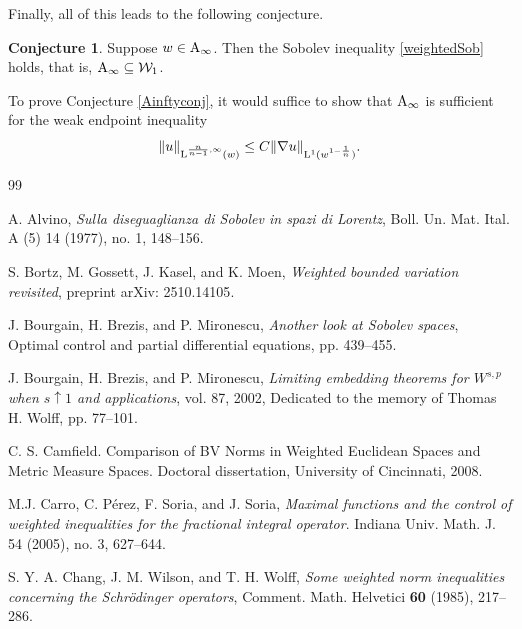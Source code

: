 \documentclass[11pt, a4paper, reqno]{amsart}
\newcommand{\A}{\textup A}
\newcommand{\Lup}{\textup{L}}
\theoremstyle{definition}
\newtheorem{conj}[theorem]{Conjecture}
\theoremstyle{remark}
\begin{document}
Finally, all of this leads to the following conjecture.

\begin{conj}\label{Ainftyconj}
Suppose $w\in \A_\infty$. Then the Sobolev inequality \eqref{weightedSob} holds, that is, $\A_\infty\subseteq \mathcal W_1$.
\end{conj}

To prove Conjecture \eqref{Ainftyconj}, it would suffice to show that $\A_\infty$ is sufficient for the weak endpoint inequality
\[
\|u\|_{\Lup^{\frac{n}{n-1},\infty}(w)}
\leq C\|\nabla u\|_{\Lup^1(w^{1-\frac1n})}.
\]



\begin{thebibliography}{99}

 A. Alvino, \emph{Sulla diseguaglianza di Sobolev in spazi di Lorentz}, Boll. Un. Mat. Ital. A (5) 14 (1977), no. 1, 148--156.

 S. Bortz, M. Gossett, J. Kasel, and K. Moen, \emph{Weighted bounded variation revisited}, preprint \textsf{arXiv: 2510.14105}.

 J. Bourgain, H. Brezis, and P. Mironescu, \emph{Another look at Sobolev spaces}, Optimal control and partial differential equations, pp. 439--455.

 J. Bourgain, H. Brezis, and P. Mironescu, \emph{Limiting embedding theorems for $W^{s,p}$ when $s \uparrow 1$ and applications}, vol. 87, 2002, Dedicated to the memory of Thomas H. Wolff, pp. 77–101.




 C. S. Camfield. Comparison of BV Norms in Weighted Euclidean Spaces and Metric Measure
Spaces. Doctoral dissertation, University of Cincinnati, 2008.

 M.J. Carro, C. P\'erez, F. Soria, and J. Soria, \emph{Maximal functions and the control of weighted inequalities for the fractional integral operator}. Indiana Univ. Math. J. 54 (2005), no. 3, 627--644.

S. Y. A. Chang, J. M. Wilson, and T. H. Wolff, {\em Some weighted norm
inequalities concerning the Schr\"odinger operators}, Comment. Math. Helvetici
{\bf 60} (1985), 217--286.




\end{thebibliography}
\end{document}
